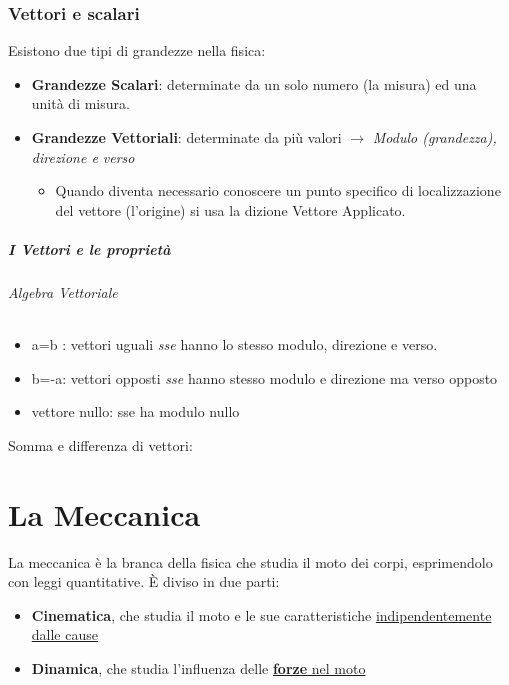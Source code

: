 \documentclass[12pt, a4paper, openany]{book}
\begin{document}
\subsection{Vettori e scalari} Esistono due tipi di grandezze nella fisica:
\begin{itemize}
    \item \textbf{Grandezze Scalari}: determinate da un solo numero (la misura) ed una unità di misura.
    \item \textbf{Grandezze Vettoriali}: determinate da più valori $\to$ \emph{Modulo (grandezza), direzione e verso}
          \begin{itemize}
              \item Quando diventa necessario conoscere un punto specifico di localizzazione del vettore (l'origine) si usa la dizione Vettore Applicato.
          \end{itemize}
\end{itemize}
\paragraph{I Vettori e le proprietà}

\subparagraph*{Algebra Vettoriale}

\begin{itemize}
    \item a=b : vettori uguali \emph{sse} hanno lo stesso modulo, direzione e verso.
    \item b=-a: vettori opposti \emph{sse} hanno stesso modulo e direzione ma verso opposto
    \item vettore nullo: sse ha modulo nullo
\end{itemize}
Somma e differenza di vettori:

\chapter{La Meccanica}
La meccanica è la branca della fisica che studia il moto dei corpi, esprimendolo con leggi quantitative.
È diviso in due parti:
\begin{itemize}
    \item \textbf{Cinematica}, che studia il moto e le sue caratteristiche \underline{indipendentemente} \underline{dalle cause}
    \item \textbf{Dinamica}, che studia l'influenza delle \underline{\textbf{forze} nel moto}
\end{itemize}
\end{document}
